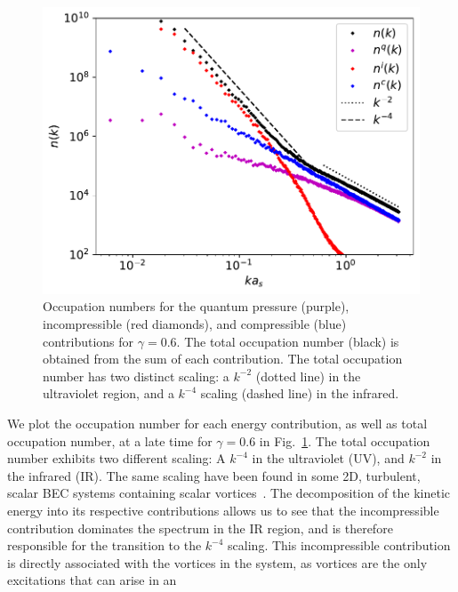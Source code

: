 \begin{figure}[t!]
    \centering
    \includegraphics[scale=0.75]{gfx/ch-twoCompDynamics/spectra.pdf}
    \caption[Occupation numbers for quantum pressure, incompressible and
    compressible contributions for a two-component system during relaxation
    dynamics]
    {Occupation numbers for the quantum pressure (purple),
        incompressible (red diamonds), and compressible (blue)
        contributions for \(\gamma=0.6\).
        The total occupation number (black) is obtained from the sum of
        each contribution.
        The total occupation number has two distinct scaling: a \(k^{-2}\)
        (dotted line) in the ultraviolet region, and a \(k^{-4}\) scaling
        (dashed line) in the infrared.\label{fig:kinetic-energy-spectra}}
\end{figure}
We plot the occupation number for each energy contribution, as well as total
occupation number, at a late time for \(\gamma=0.6\) in
Fig.~\ref{fig:kinetic-energy-spectra}.
The total occupation number exhibits two different scaling: A \(k^{-4}\) in the
ultraviolet (UV), and \(k^{-2}\) in the infrared (IR).
The same scaling have been found in some 2D, turbulent, scalar BEC systems
containing scalar vortices~\cite{Nowak2012}.
The decomposition of the kinetic energy into its respective contributions
allows us to see that the incompressible contribution dominates the spectrum
in the IR region, and is therefore responsible for the transition to the
\(k^{-4}\) scaling.
This incompressible contribution is directly associated with the vortices in
the system, as vortices are the only excitations that can arise in an
